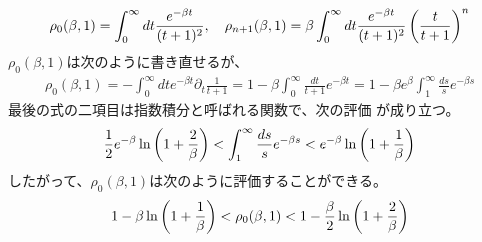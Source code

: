 \begin{description}
\begin{equation*}
		\rho_0(\beta,1) = \int_0^\infty dt \frac{e^{- \beta t}}{(t + 1)^2}
		,\quad \rho_{n+1}(\beta,1) = \beta\int_0^\infty dt 
			\frac{e^{- \beta t}}{(t + 1)^2}\mathinner{\left({\frac{t}{t + 1}}\right)}^n
	\end{equation*}
	$\rho_0(\beta,1)$は次のように書き直せるが、
	\begin{equation*}\begin{split}
		\rho_0(\beta,1)
		= - \int_0^\infty dt e^{- \beta t}\partial_t\frac{1}{t + 1}
		= 1 - \beta\int_0^\infty \frac{dt}{t + 1}e^{- \beta t}
		= 1 - \beta e^\beta\int_1^\infty \frac{ds}{s}e^{- \beta s}
	\end{split}\end{equation*}
	最後の式の二項目は指数積分と呼ばれる関数\cite{Expon0:online}で、次の評価
	が成り立つ。
	\begin{equation*}
		\frac{1}{2}e^{- \beta}\ln\mathinner{\left({1 + \frac{2}{\beta}}\right)}
		< \int_1^\infty \frac{ds}{s}e^{- \beta s}
		< e^{- \beta}\ln\mathinner{\left({1 + \frac{1}{\beta}}\right)}
	\end{equation*}
	したがって、$\rho_0(\beta,1)$は次のように評価することができる。
	\begin{equation*}
		1 - \beta\ln\mathinner{\left({1 + \frac{1}{\beta}}\right)}
		< \rho_0(\beta,1)
		< 1 - \frac{\beta}{2}\ln\mathinner{\left({1 + \frac{2}{\beta}}\right)}
	\end{equation*}
\end{description} %
